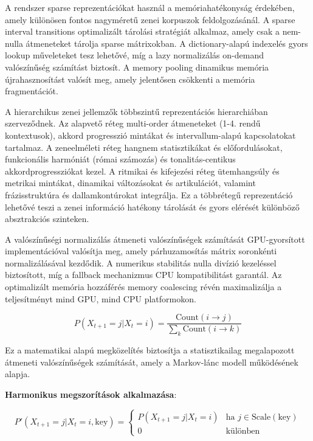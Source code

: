A rendszer sparse reprezentációkat használ a memóriahatékonyság érdekében, amely különösen fontos nagyméretű zenei korpuszok feldolgozásánál. A sparse interval transitions optimalizált tárolási stratégiát alkalmaz, amely csak a nem-nulla átmeneteket tárolja sparse mátrixokban. A dictionary-alapú indexelés gyors lookup műveleteket tesz lehetővé, míg a lazy normalizálás on-demand valószínűség számítást biztosít. A memory pooling dinamikus memória újrahasznosítást valósít meg, amely jelentősen csökkenti a memória fragmentációt.

A hierarchikus zenei jellemzők többszintű reprezentációs hierarchiában szerveződnek. Az alapvető réteg multi-order átmeneteket (1-4. rendű kontextusok), akkord progresszió mintákat és intervallum-alapú kapcsolatokat tartalmaz. A zeneelméleti réteg hangnem statisztikákat és előfordulásokat, funkcionális harmóniát (római számozás) és tonalitás-centikus akkordprogressziókat kezel. A ritmikai és kifejezési réteg ütemhangsúly és metrikai mintákat, dinamikai változásokat és artikulációt, valamint frázisstruktúra és dallamkontúrokat integrálja. Ez a többrétegű reprezentáció lehetővé teszi a zenei információ hatékony tárolását és gyors elérését különböző absztrakciós szinteken.

A valószínűségi normalizálás átmeneti valószínűségek számítását GPU-gyorsított implementációval valósítja meg, amely párhuzamosítás mátrix soronkénti normalizálásával kezdődik. A numerikus stabilitás nulla divízió kezeléssel biztosított, míg a fallback mechanizmus CPU kompatibilitást garantál. Az optimalizált memória hozzáférés memory coalescing révén maximalizálja a teljesítményt mind GPU, mind CPU platformokon.

\begin{equation}
P(X_{t+1} = j | X_t = i) = \frac{\text{Count}(i \rightarrow j)}{\sum_{k} \text{Count}(i \rightarrow k)}
\end{equation}

Ez a matematikai alapú megközelítés biztosítja a statisztikailag megalapozott átmeneti valószínűségek számítását, amely a Markov-lánc modell működésének alapja.

\textbf{Harmonikus megszorítások alkalmazása}:

\begin{equation}
P'(X_{t+1} = j | X_t = i, \text{key}) = \begin{cases}
P(X_{t+1} = j | X_t = i) & \text{ha } j \in \text{Scale}(\text{key}) \\
0 & \text{különben}
\end{cases}
\end{equation}

